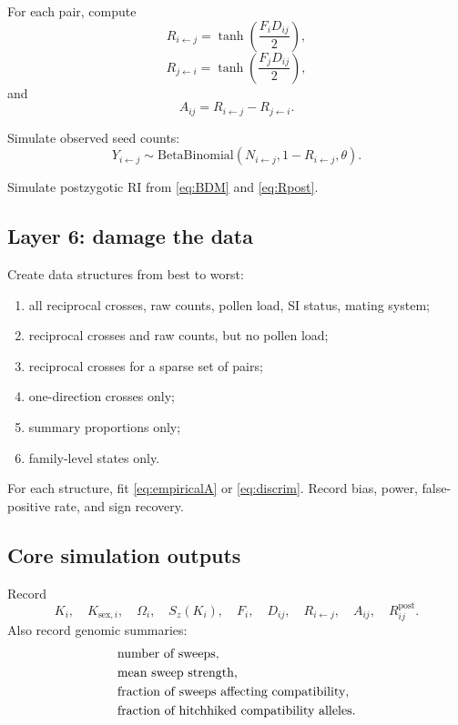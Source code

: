 \documentclass[12pt]{article}
\newcommand{\Rpost}{R^{\mathrm{post}}}
\begin{document}
For each pair, compute
\begin{equation}
R_{i\leftarrow j}=\tanh\left(\frac{F_iD_{ij}}{2}\right),
\end{equation}
\begin{equation}
R_{j\leftarrow i}=\tanh\left(\frac{F_jD_{ij}}{2}\right),
\end{equation}
and
\begin{equation}
A_{ij}=R_{i\leftarrow j}-R_{j\leftarrow i}.
\end{equation}

Simulate observed seed counts:
\begin{equation}
Y_{i\leftarrow j}\sim \mathrm{BetaBinomial}(N_{i\leftarrow j},1-R_{i\leftarrow j},\theta).
\end{equation}

Simulate postzygotic RI from \eqref{eq:BDM} and \eqref{eq:Rpost}.

\subsection{Layer 6: damage the data}

Create data structures from best to worst:
\begin{enumerate}
\item all reciprocal crosses, raw counts, pollen load, SI status, mating system;
\item reciprocal crosses and raw counts, but no pollen load;
\item reciprocal crosses for a sparse set of pairs;
\item one-direction crosses only;
\item summary proportions only;
\item family-level states only.
\end{enumerate}
For each structure, fit \eqref{eq:empiricalA} or \eqref{eq:discrim}. Record bias, power, false-positive rate, and sign recovery.

\subsection{Core simulation outputs}

Record
\begin{equation}
K_i,\quad K_{\mathrm{sex},i},\quad \Omega_i,\quad S_z(K_i),\quad F_i,\quad D_{ij},\quad R_{i\leftarrow j},\quad A_{ij},\quad \Rpost_{ij}.
\end{equation}
Also record genomic summaries:
\begin{align*}
&\hbox{number of sweeps},\\
&\hbox{mean sweep strength},\\
&\hbox{fraction of sweeps affecting compatibility},\\
&\hbox{fraction of hitchhiked compatibility alleles}.
\end{align*}
\end{document}
